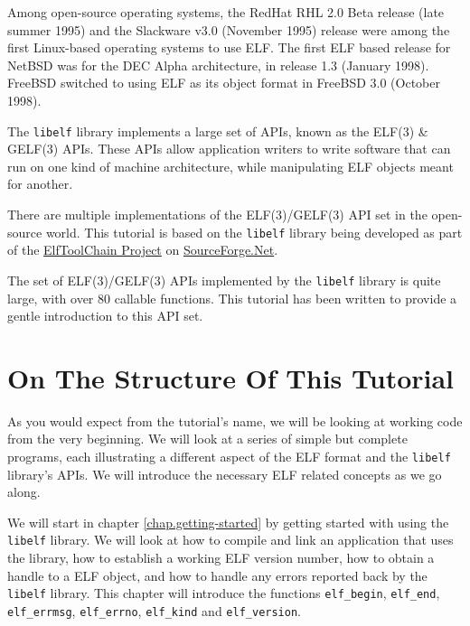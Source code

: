 \documentclass[a4paper,pdftex]{book}
\newcommand{\elftoolchainproject}{\href{https://elftoolchain.sourceforge.io/}%
    {ElfToolChain Project}\xspace}
\newcommand{\function}[1]{\texttt{#1}}
\newcommand{\library}[1]{\texttt{#1}}
\newcommand{\reg}{\textregistered\xspace}
\newcommand{\trade}{\texttrademark\xspace}
\begin{document}
Among open-source operating systems, the
RedHat\trade RHL 2.0 Beta release (late summer 1995) and the Slackware
v3.0 (November 1995) release were among the first Linux\reg-based
operating systems to use ELF.  The first ELF based release for
NetBSD\trade was for the DEC Alpha\trade architecture, in release 1.3
(January 1998).  FreeBSD\trade switched to using ELF as its object
format in FreeBSD 3.0 (October 1998).

The \library{libelf} library implements a large set of APIs, known as
the ELF(3) \& GELF(3) APIs. \index{libelf@\library{libelf}!purpose of}
These APIs allow application writers to write software that can run on
one kind of machine architecture, while manipulating ELF objects meant
for another.

There are multiple implementations of the ELF(3)/GELF(3) API set in
the open-source world.  This tutorial is based on the \library{libelf}
library being developed as part of the \elftoolchainproject on
\href{https://sourceforge.net/}{SourceForge.Net}.

The set of ELF(3)/GELF(3) APIs implemented by the \library{libelf}
library is quite large, with over 80 callable functions.  This
tutorial has been written to provide a gentle introduction to this API
set.

\section{On The Structure Of This Tutorial}

As you would expect from the tutorial's name, we will be looking at
working code from the very beginning. We will look at a series of
simple but complete programs, each illustrating a different aspect of
the ELF format and the \library{libelf} library's APIs. We will
introduce the necessary ELF related concepts as we go along.

We will start in chapter \vref{chap.getting-started} by getting
started with using the \library{libelf} library. We will look at how
to compile and link an application that uses the library, how to
establish a working ELF version number, how to obtain a handle to a
ELF object, and how to handle any errors reported back by the
\library{libelf} library.  This chapter will introduce the functions
\function{elf\_begin}, \function{elf\_end}, \function{elf\_errmsg},
\function{elf\_errno}, \function{elf\_kind} and
\function{elf\_version}.
\end{document}
